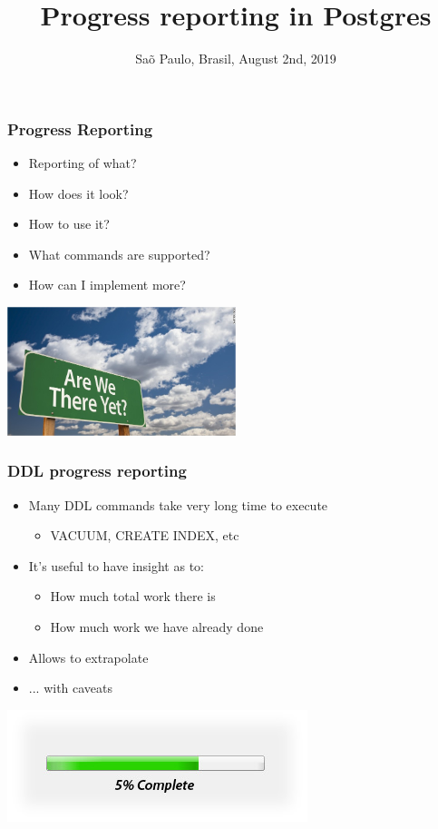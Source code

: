 \documentclass[ignorenonframetext,t]{beamer}
\institute[PGConf.Brasil 2019]{Postgres reporting in progress}
\date{Sa\~o Paulo, Brasil, August 2nd, 2019}
\title{Progress reporting in Postgres}
\date{}
\begin{document}
  \begin{frame}[plain]
    \titlepage
  \end{frame}

\begin{frame}
\frametitle{Progress Reporting}

\begin{itemize}
	\item Reporting of what?
	\item How does it look?
	\item How to use it?
	\item What commands are supported?
	\item How can I implement more?
\end{itemize}

\pause \hfill\includegraphics[width=0.5\textwidth]{are_we_there_yet_1.jpg}

\end{frame}


\begin{frame}
  \frametitle{DDL progress reporting}

  \begin{itemize}
    \item Many DDL commands take very long time to execute
      \begin{itemize}
	\item VACUUM, CREATE INDEX, etc
      \end{itemize}
    \item It's useful to have insight as to:
      \begin{itemize}
	\item How much total work there is
	\item How much work we have already done
      \end{itemize}
    \item Allows to extrapolate
      \pause
    \item ... with caveats
  \end{itemize}
\hfill  \includegraphics{5-percent-0.jpg}

\end{frame}
\end{document}

